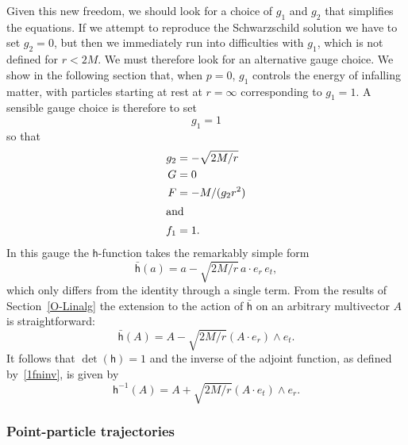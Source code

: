 \documentclass[a4paper]{article}
\numberwithin{equation}{section}
\newcommand{\dt}{\! \cdot \!}
\newcommand{\wdg}{\! \wedge \!}
\newcommand{\lih}{\mathsf{h}}
\newcommand{\lbh}{\bar{\mathsf{h}}}
\newcommand{\ho}{\lbh}
\newcommand{\hu}{\lih}
\renewcommand{\dh}{\det(\hu)}
\begin{document}
Given this new freedom, we should look for a choice of $g_1$ and $g_2$
that simplifies the equations.  If we attempt to reproduce the
Schwarzschild solution we have to set $g_2=0$, but then we immediately
run into difficulties with $g_1$, which is not defined for $r<2M$.  We
must therefore look for an alternative gauge choice.  We show in the
following section that, when $p=0$, $g_1$ controls the energy of
infalling matter, with particles starting at rest at $r=\infty$
corresponding to $g_1=1$.  A sensible gauge choice is therefore to set
%
\begin{equation}
g_1 = 1
\end{equation}
%
so that
%
\begin{align}
g_2 &= -\sqrt{2M/r} \\ 
G &= 0 \\ 
F &= - M/(g_2 r^2) \\ 
\intertext{and}
f_1 &= 1.
\end{align}
%
In this gauge the $\lih$-function takes the remarkably simple form
%
\begin{equation}
\ho(a) = a - \sqrt{2M/r} \, a \dt e_r \, e_t,
\label{bh-soln}
\end{equation}
%
which only differs from the identity through a single term.  From the
results of Section~\ref{O-Linalg} the extension to the action of $\ho$
on an arbitrary multivector $A$ is straightforward:
%
\begin{equation}
\ho(A) = A - \sqrt{2M/r} (A \dt e_r) \wdg e_t.
\end{equation} 
%
It follows that $\dh=1$ and the inverse of the adjoint function, as
defined by~\eqref{1fninv}, is given by
%
\begin{equation}
\hu^{-1}(A) = A + \sqrt{2M/r} (A \dt e_t) \wdg e_r. 
\end{equation} 
%


\subsubsection*{Point-particle trajectories}
\end{document}
